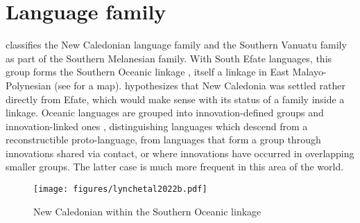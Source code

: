 \section{Language family}
\label{sec:Ling_Profile}
\largerpage
\textcite[112]{lynch_oceanic_2002} classifies the New Caledonian language family and the Southern Vanuatu family as part of the Southern Melanesian family. With South Efate languages, this group forms the Southern Oceanic linkage \parencite[112]{lynch_oceanic_2002}, itself a linkage in East Malayo-Polynesian (see  for a map). \textcite[334]{lynch_efate-erromango_2004} hypothesizes that New Caledonia was settled rather directly from Efate, which would make sense with its status of a family inside a linkage.
Oceanic languages are grouped into innovation-defined groups and innovation-linked ones \parencite[93]{lynch_oceanic_2002}, distinguishing languages which descend from a reconstructible proto-language, from languages that form a group through innovations shared via contact, or where innovations have occurred in overlapping smaller groups. The latter case is much more frequent in this area of the world. 
\begin{figure}
	\texttt{[image: figures/lynchetal2022b.pdf]}
	\caption{New Caledonian within the Southern Oceanic linkage \parencite[113]{lynch_oceanic_2002}}
	\label{fig:SouthOceanic}
\end{figure}


